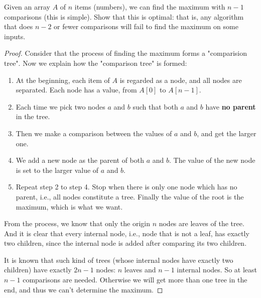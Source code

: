 


\maketitle

\begin{thm}{}{}
    Given an array $A$ of $n$ items (numbers), we can find the maximum with $n - 1$ comparisons (this is simple). Show that this is optimal: that is, any algorithm that does $n - 2$ or fewer comparisons will fail to find the maximum on some inputs.
\end{thm}
\begin{proof}
    Consider that the process of finding the maximum forms a "comparision tree". Now we explain how the "comparison tree" is formed:
    
    \begin{enumerate}
        \item At the beginning, each item of $A$ is regarded as a node, and all nodes are separated. Each node has a value, from $A[0]$ to $A[n - 1]$.
        \item Each time we pick two nodes $a$ and $b$ such that both $a$ and $b$ have \textbf{no parent} in the tree.
        \item Then we make a comparison between the values of $a$ and $b$, and get the larger one. 
        \item We add a new node as the parent of both $a$ and $b$. The value of the new node is set to the larger value of $a$ and $b$.
        \item Repeat step 2 to step 4. Stop when there is only one node which has no parent, i.e., all nodes constitute a tree. Finally the value of the root is the maximum, which is what we want.
    \end{enumerate}
    
    From the process, we know that only the origin $n$ nodes are leaves of the tree. And it is clear that every internal node, i.e., node that is not a leaf, has exactly two children, since the internal node is added after comparing its two children.
    
    It is known that such kind of trees (whose internal nodes have exactly two children) have exactly $2n - 1$ nodes: $n$ leaves and $n - 1$ internal nodes. So at least $n - 1$ comparisons are needed. Otherwise we will get more than one tree in the end, and thus we can't determine the maximum.
\end{proof}

\newpage



